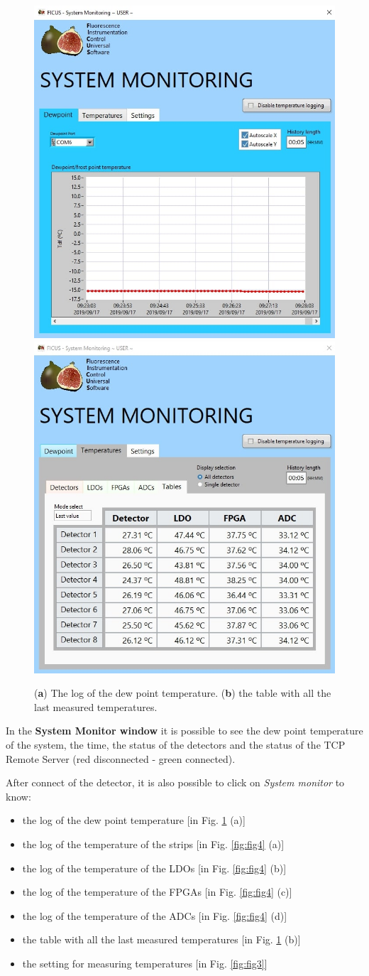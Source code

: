 \documentclass[a4paper,12pt,oneside,pdflatex,italian,final,twocolumn]{article}
\begin{document}
\begin{figure}[h]
\centering
\subfloat
{\includegraphics[width=.45\textwidth]{Capture15.jpg}} \quad
\subfloat
{\includegraphics[width=.45\textwidth]{Capture19.jpg}} \\

\caption{(\textbf{a}) The log of the dew point temperature. (\textbf{b}) the table with all the last measured temperatures.}\label{fig:fig2}
\end{figure}

In the \textbf{System Monitor window} it is possible to see the dew point temperature of the system, the time, the status of the detectors and the status of the TCP Remote Server (red disconnected - green connected). 

After connect of the detector, it is also possible to click on \textit{System monitor} to know: 
\begin{itemize}
    \item the log of the dew point temperature [in Fig. \ref{fig:fig2} (a)]
    \item the log of the temperature of the strips [in Fig. \ref{fig:fig4} (a)]
    \item the log of the temperature of the LDOs [in Fig. \ref{fig:fig4} (b)]
    \item the log of the temperature of the FPGAs [in Fig. \ref{fig:fig4} (c)]
    \item the log of the temperature of the ADCs [in Fig. \ref{fig:fig4} (d)]
    \item the table with all the last measured temperatures [in Fig. \ref{fig:fig2} (b)]
    \item the setting for measuring temperatures [in Fig. \ref{fig:fig3}]
\end{itemize}
\end{document}
